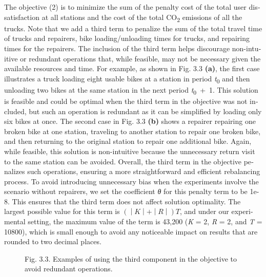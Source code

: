 \documentclass[
  english,
]{article}
\begin{document}
\begin{otherlanguage}{english}
\protect{}\label{p0220}
The objective (2) is to minimize the sum of the penalty cost of the total user dissatisfaction at
all stations and the cost of the total CO\textsubscript{2} emissions of all the trucks. Note that we
add a third term to penalize the sum of the total travel time of trucks and repairers, bike
loading/unloading times for trucks, and repairing times for the repairers. The inclusion of the
third term helps discourage non-intuitive or redundant operations that, while feasible, may not be
necessary given the available resources and time. For example, as shown in Fig. 3.3 \textbf{(a)},
the first case illustrates a truck loading eight usable bikes at a station in period
\emph{t}\textsubscript{0} and then unloading two bikes at the same station in the next period
\emph{t}\textsubscript{0}~+~1. This solution is feasible and could be optimal when the third term in
the objective was not included, but such an operation is redundant as it can be simplified by
loading only six bikes at once. The second case in Fig. 3.3 \textbf{(b)} shows a repairer repairing
one broken bike at one station, traveling to another station to repair one broken bike, and then
returning to the original station to repair one additional bike. Again, while feasible, this
solution is non-intuitive because the unnecessary return visit to the same station can be avoided.
Overall, the third term in the objective penalizes such operations, ensuring a more straightforward
and efficient rebalancing process. To avoid introducing unnecessary bias when the experiments
involve the scenario without repairers, we set the coefficient \emph{θ} for this penalty term to be
1e-8. This ensures that the third term does not affect solution optimality. The largest possible
value for this term is \(\left( \middle| K \middle| + \middle| R \middle| \right)T\), and under our
experimental setting, the maximum value of the term is 43,200 (\textbar{}\emph{K}\textbar{} = 2,
\textbar{}\emph{R}\textbar{} = 2, and \emph{T} = 10800), which is small enough to avoid any
noticeable impact on results that are rounded to two decimal places.

\begin{figure}
\centering
Fig. 3.3. Examples of using the third component in the objective to avoid redundant operations.
\caption{}\label{f0015}
\end{figure}


\end{otherlanguage}
\end{document}

